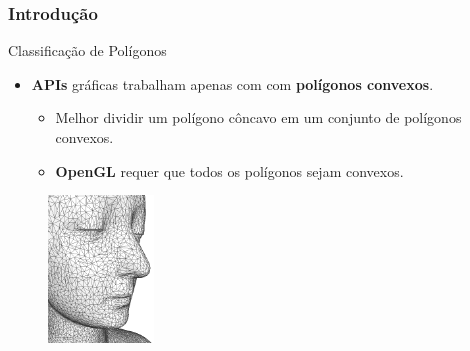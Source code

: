 \documentclass{beamer}
\begin{document}
\begin{frame}
\frametitle{Introdução}

		\begin{block}{Classificação de Polígonos}
		\begin{itemize}
			\item \textbf{APIs} gráficas trabalham apenas com com \textbf{polígonos convexos}.
			\begin{itemize}
				\item Melhor dividir um polígono côncavo em um conjunto de polígonos convexos.
				\item \textbf{OpenGL} requer que todos os polígonos sejam convexos.
			\end{itemize}
		\end{itemize}
		\end{block}
		
		\begin{figure}[!h]
			\begin{center}
				\includegraphics[width=0.25\textwidth]{Figures/TriMes}
			\end{center}
		\end{figure}
	
\end{frame}
\end{document}
